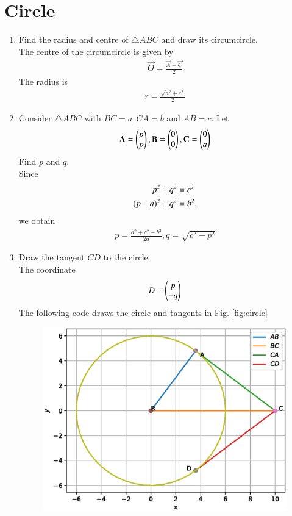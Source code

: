 \documentclass[journal,12pt,twocolumn]{IEEEtran}
\renewcommand\thesection{\arabic{section}}
\begin{document}
\section{Circle}
\begin{enumerate}[label=\thesection.\arabic*
,ref=\thesection.\theenumi]
\item Find the radius and centre of $\triangle ABC$ and draw its circumcircle.
\\
\solution The centre of the circumcircle is given by 
\begin{align}
\label{eq:rt_triang_circum}
\vec{O}=\frac{\vec{A}+\vec{C}}{2}
\end{align}
The radius is 
\begin{align}
\label{eq:rt_triang_circum_rad}
r=\frac{\sqrt{a^2+c^2}}{2}
\end{align}
%
\item Consider $\triangle ABC$ with $BC = a, CA = b$ and $AB= c$.  Let
\begin{align}
\label{eq:triangle_coord_def}
\mathbf{A}=\begin{pmatrix}p \\p\end{pmatrix},
\mathbf{B}=\begin{pmatrix}0 \\0\end{pmatrix},
\mathbf{C}=\begin{pmatrix}0 \\a\end{pmatrix}
\end{align}
Find  $p$ and $q$.
\\
\solution 
%
Since
\begin{align}
\label{eq:triangle_dist}
p^2+q^2&= c^2
\\
\left(p-a\right)^2+q^2&= b^2,
\end{align}
we obtain
\begin{align}
p = \frac{a^2+c^2-b^2}{2a},
q = \sqrt{c^2-p^2}
\end{align}
%
\item Draw the tangent $CD$ to the circle.
\\
\solution The coordinate
\begin{align}
\label{eq:rt_tang_pair}
D=\begin{pmatrix}p \\ -q\end{pmatrix}
\end{align}
The following code draws the circle and tangents in Fig. \ref{fig:circle}

%
\begin{figure}
\centering
\includegraphics[width=\columnwidth]{./figs/circle.eps}

\end{figure}
\end{enumerate}
\end{document}
